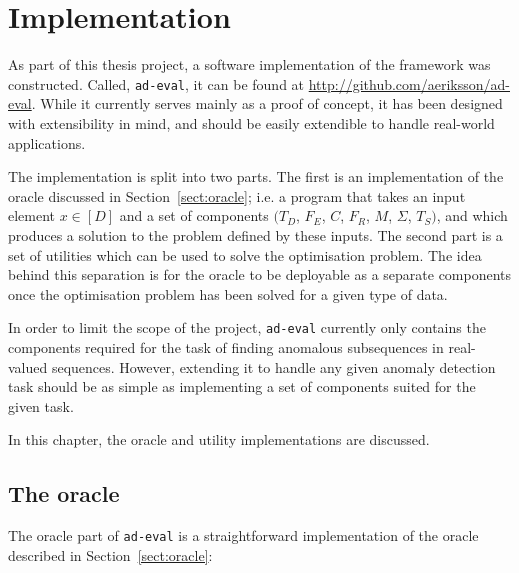 \chapter{Implementation}
\label{ch:implementation}

As part of this thesis project, a software implementation of the framework was constructed. Called, \texttt{ad-eval}, it can be found at \url{http://github.com/aeriksson/ad-eval}. While it currently serves mainly as a proof of concept, it has been designed with extensibility in mind, and should be easily extendible to handle real-world applications.

The implementation is split into two parts. The first is an implementation of the oracle discussed in Section~\ref{sect:oracle}; i.e. a program that takes an input element $x \in [D]$ and a set of components $(T_D$, $F_E$, $C$, $F_R$, $M$, $\Sigma$, $T_S)$, and which produces a solution to the problem defined by these inputs. The second part is a set of utilities which can be used to solve the optimisation problem. The idea behind this separation is for the oracle to be deployable as a separate components once the optimisation problem has been solved for a given type of data.

In order to limit the scope of the project, \texttt{ad-eval} currently only contains the components required for the task of finding anomalous subsequences in real-valued sequences. However, extending it to handle any given anomaly detection task should be as simple as implementing a set of components suited for the given task.

In this chapter, the oracle and utility implementations are discussed.

\section{The oracle}

The oracle part of \texttt{ad-eval} is a straightforward implementation of the oracle described in Section~\ref{sect:oracle}:

\begin{algorithmic}
     
    \EndFor{}
\end{algorithmic}

